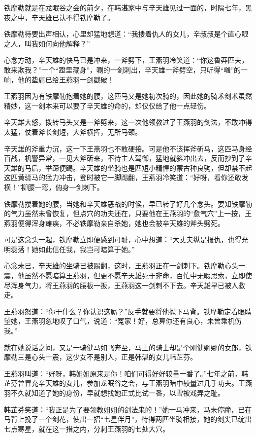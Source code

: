 \documentclass[12pt,oneside]{book}
\begin{document}
铁摩勒就是在龙眠谷之会的前夕，在韩湛家中与辛天雄见过一面的，时隔七年，黑夜之中，辛天雄已认不得铁摩勒了。

铁摩勒待要出声相认，心里却猛地想道：``我搂着仇人的女儿，辛叔叔是个直心眼之人，叫我如何向他解释？''

心念方动，辛天雄的快马已是冲来，一斧劈下，王燕羽冷笑道：``你这鲁莽匹夫，敢来欺我？''一个``蹬里藏身''，唰的一剑刺出，辛天雄一斧劈空，只听得``嗤''的一响，他的垫肩已给王燕羽一剑戳破！

王燕羽因为有铁摩勒抱着她的腰，这匹马又是她初次骑的，因此她的骑术剑术虽然精妙，这一剑本来可以要了辛天雄的命的，却仅仅给了他一点轻伤。

辛天雄大怒，拨转马头又是一斧劈来，这一次他领教过了王燕羽的剑法，不敢冲得太猛，仗着斧长剑短，大斧横挥，无所马颈。

辛天雄的斧重力沉，这一下王燕羽也不敢硬接。可是他不该挥斧斫马，这匹马身经百战，机警异常，一见大斧斫来，不待主人驾御，猛地就斜冲出去，反而抄到了辛天雄的马后，举蹄便踢。辛天雄的坐骑也是匹短小精悍的蒙古种良驹，但却禁不起这匹黄骠马的猛力冲击，登时被它一脚踢翻，王燕羽冷笑道：``好呀，看你还敢发横！''柳腰一弯，俯身一剑刺下。

铁摩勒搂着她的腰，当她和辛天雄恶战的时候，早已转了好几个念头。要知铁摩勒的气力虽然未曾恢复，但点穴的功夫还在，只要他在王燕羽的``愈气穴''上一按，王燕羽便得浑身瘫痪，不必铁摩勒亲自杀她，她也会被辛天雄的斧头劈死。

可是这念头一起，铁摩勒立即便感到可耻，心中想道：``大丈夫纵是报仇，也得光明磊落！她如此信任我，我岂可暗算于她。''

心念未已，辛天雄的坐骑已被踢翻，这时，王燕羽正在一剑刺下。铁摩勒心头一震，他虽然不愿暗算王燕羽，但更不愿辛天雄死于非命，百忙中无暇思索，立即使尽浑身气力，将王燕羽的腰板一扳，王燕羽这一剑刺不下去。辛天雄早已被人救走。

王燕羽怒道：``你干什么？你认识这厮？''反手就要将他抛下马背。铁摩勒定着眼睛望她，王燕羽忽地叹了口气，说道：``冤家！好，总算你还有良心，未曾乘机伤我。''

就在她说话之间，又是一骑健马如飞奔至，马上的骑士却是个刚健婀娜的女郎，铁摩勒三是心头一震，这少女不是别人，正是韩湛的女儿韩芷芬。

王燕羽叫道：``好呀，韩姐姐原来是你！咱们可得好好较量一番了。''七年之前，韩芷芬曾冒充辛天雄的女儿，参加龙眠谷之会，与王燕羽暗中较量过几手功夫。王燕羽不久就知道了她的身份，早就想找她正式比试一番，以雪被戏弄之耻。

韩芷芬笑道：``我正是为了要领教姐姐的剑法来的！''她一马冲来，马未停蹄，已在马背上挽了一个剑花，使出一招``七星伴月''，待得两匹坐骑相接，她的剑尖已绽出七点寒星，就在这一措之内，分刺王燕羽的七处大穴。
\end{document}

